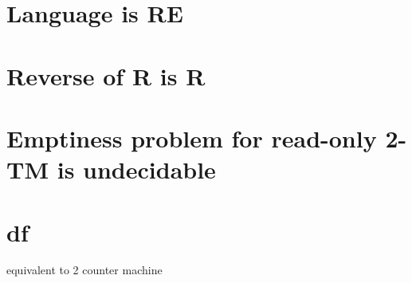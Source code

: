 \documentclass{article}
\begin{document}
\section{Language is RE}

\section{Reverse of R is R}

\section{Emptiness problem for read-only 2-TM is undecidable}






\section{df}

equivalent to 2 counter machine
\end{document}
